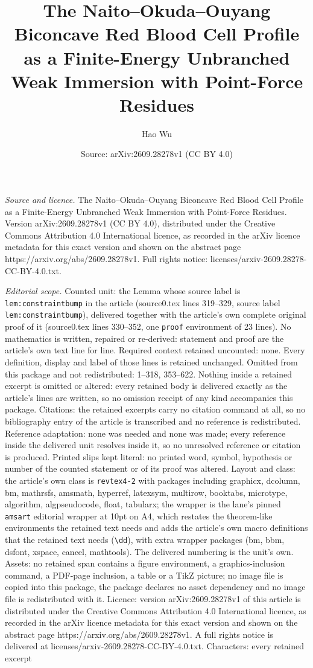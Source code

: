 \documentclass[10pt,a4paper]{amsart}
\title[The Naito--Okuda--Ouyang Biconcave Red Blood Cell Profile as]{The Naito--Okuda--Ouyang Biconcave Red Blood Cell Profile as a Finite-Energy Unbranched Weak Immersion with Point-Force Residues}
\author{Hao Wu}
\date{Source: arXiv:2609.28278v1 (CC BY 4.0)}
\begin{document}
\maketitle

\noindent\emph{Source and licence.} The Naito--Okuda--Ouyang Biconcave Red Blood Cell Profile as a Finite-Energy Unbranched Weak Immersion with Point-Force Residues. Version arXiv:2609.28278v1 (CC BY 4.0), distributed under the Creative Commons Attribution 4.0 International licence, as recorded in the arXiv licence metadata for this exact version and shown on the abstract page https://arxiv.org/abs/2609.28278v1. Full rights notice: licenses/arxiv-2609.28278-CC-BY-4.0.txt.\par\smallskip

\noindent\textit{Editorial scope.} Counted unit: the Lemma whose source label is \texttt{lem:constraintbump} in the article (source0.tex lines 319--329, source label \texttt{lem:constraintbump}), delivered together with the article's own complete original proof of it (source0.tex lines 330--352, one \texttt{proof} environment of 23 lines). No mathematics is written, repaired or re-derived: statement and proof are the article's own text line for line. Required context retained uncounted: none. Every definition, display and label of those lines is retained unchanged. Omitted from this package and not redistributed: 1--318, 353--622. Nothing inside a retained excerpt is omitted or altered: every retained body is delivered exactly as the article's lines are written, so no omission receipt of any kind accompanies this package. Citations: the retained excerpts carry no citation command at all, so no bibliography entry of the article is transcribed and no reference is redistributed. Reference adaptation: none was needed and none was made; every reference inside the delivered unit resolves inside it, so no unresolved reference or citation is produced. Printed slips kept literal: no printed word, symbol, hypothesis or number of the counted statement or of its proof was altered. Layout and class: the article's own class is \texttt{revtex4-2} with packages including graphicx, dcolumn, bm, mathrsfs, amsmath, hyperref, latexsym, multirow, booktabs, microtype, algorithm, algpseudocode, float, tabularx; the wrapper is the lane's pinned \texttt{amsart} editorial wrapper at 10pt on A4, which restates the theorem-like environments the retained text needs and adds the article's own macro definitions that the retained text needs (\texttt{\textbackslash dd}), with extra wrapper packages (bm, bbm, dsfont, xspace, cancel, mathtools). The delivered numbering is the unit's own. Assets: no retained span contains a figure environment, a graphics-inclusion command, a PDF-page inclusion, a table or a TikZ picture; no image file is copied into this package, the package declares no asset dependency and no image file is redistributed with it. Licence: version arXiv:2609.28278v1 of this article is distributed under the Creative Commons Attribution 4.0 International licence, as recorded in the arXiv licence metadata for this exact version and shown on the abstract page https://arxiv.org/abs/2609.28278v1. A full rights notice is delivered at licenses/arxiv-2609.28278-CC-BY-4.0.txt. Characters: every retained excerpt 
\end{document}
